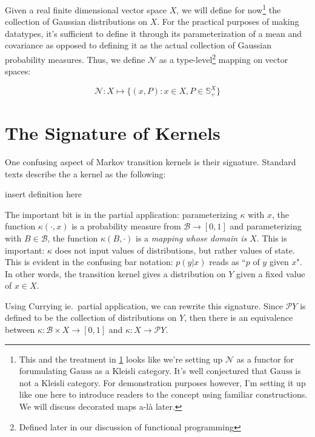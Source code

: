 \newcommand{\gaussian}{\mathcal{N}}
\newcommand{\gausscat}{\mathrm{Gauss}}
Given a real finite dimensional vector space $X$, we will define for now\footnote{This and the treatment in \ref{sec:kernel-signature} looks like we're setting up $\gaussian$ as a functor for forumulating $\gausscat$ as a Kleisli category. It's well conjectured that $\gausscat$ is not a Kleisli category. For demonstration purposes however, I'm setting it up like one here to introduce readers to the concept using familiar constructions. We will discuss decorated maps a-l\`a \cite{stein2022extended} later.} the collection of Gaussian distributions on $X$.
For the practical purposes of making datatypes, it's sufficient to define it through its parameterization of a mean and covariance as opposed to defining it as the actual collection of Gaussian probability measures.
Thus, we define $\gaussian$ as a type-level\footnote{Defined later in our discussion of functional programming} mapping on vector spaces:

\newcommand{\symmetric}{\mathds{S}}
\begin{equation}
    \gaussian : X \mapsto \{(x,P) : x\in X, P \in \symmetric^X_+\}
\end{equation}

\section{The Signature of Kernels}
\label{sec:kernel-signature}

One confusing aspect of Markov transition kernels is their signature. 
Standard texts describe the a kernel as the following:

insert definition here

The important bit is in the partial application: parameterizing $\kappa$ with $x$, the function $\kappa(\cdot, x)$ is a probability measure from $\mathcal{B} \rightarrow [0,1]$ and parameterizing with $B\in \mathcal{B}$, the function $\kappa(B,\cdot)$ is a \emph{mapping whose domain is $X$}.
This is important: $\kappa$ does not input values of distributions, but rather values of state.
This is evident in the confusing bar notation: $p(y|x)$ reads as ``$p$ of $y$ given $x$".
In other words, the transition kernel gives a distribution on $Y$ given a fixed value of $x\in X$.

\newcommand{\giry}{\mathcal{P}}
Using Currying ie.\ partial application, we can rewrite this signature. 
Since $\giry Y$ is defined to be the collection of distributions on $Y$, then there is an equivalence between $\kappa : \mathcal{B} \times X \rightarrow [0,1]$ and $\kappa : X \rightarrow \giry Y$.

